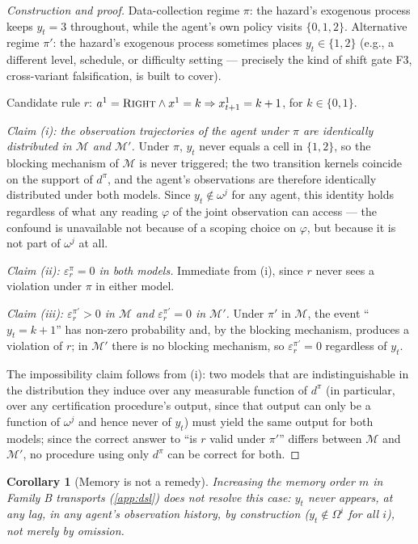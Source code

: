 \documentclass[11pt]{article}
\theoremstyle{plain}
\newtheorem{corollary}[theorem]{Corollary}
\theoremstyle{definition}
\theoremstyle{remark}
\begin{document}
\begin{proof}[Construction and proof]
Data-collection regime $\pi$: the hazard's exogenous process keeps $y_t=3$ throughout, while the agent's own policy visits $\{0,1,2\}$. Alternative regime $\pi'$: the hazard's exogenous process sometimes places $y_t\in\{1,2\}$ (e.g., a different level, schedule, or difficulty setting --- precisely the kind of shift gate F3, cross-variant falsification, is built to cover).

Candidate rule $r$: $a^1=\textsc{Right}\wedge x^1=k \Rightarrow x^1_{t+1}=k+1$, for $k\in\{0,1\}$.

\emph{Claim (i): the observation trajectories of the agent under $\pi$ are identically distributed in $\mathcal{M}$ and $\mathcal{M}'$.} Under $\pi$, $y_t$ never equals a cell in $\{1,2\}$, so the blocking mechanism of $\mathcal{M}$ is never triggered; the two transition kernels coincide on the support of $d^\pi$, and the agent's observations are therefore identically distributed under both models. Since $y_t\notin\omega^j$ for any agent, this identity holds regardless of what any reading $\varphi$ of the joint observation can access --- the confound is unavailable not because of a scoping choice on $\varphi$, but because it is not part of $\omega^j$ at all.

\emph{Claim (ii): $\varepsilon^\pi_r=0$ in both models.} Immediate from (i), since $r$ never sees a violation under $\pi$ in either model.

\emph{Claim (iii): $\varepsilon^{\pi'}_r>0$ in $\mathcal{M}$ and $\varepsilon^{\pi'}_r=0$ in $\mathcal{M}'$.} Under $\pi'$ in $\mathcal{M}$, the event ``$y_t=k+1$'' has non-zero probability and, by the blocking mechanism, produces a violation of $r$; in $\mathcal{M}'$ there is no blocking mechanism, so $\varepsilon^{\pi'}_r=0$ regardless of $y_t$.

The impossibility claim follows from (i): two models that are indistinguishable in the distribution they induce over any measurable function of $d^\pi$ (in particular, over any certification procedure's output, since that output can only be a function of $\omega^j$ and hence never of $y_t$) must yield the same output for both models; since the correct answer to ``is $r$ valid under $\pi'$'' differs between $\mathcal{M}$ and $\mathcal{M}'$, no procedure using only $d^\pi$ can be correct for both.
\end{proof}

\begin{corollary}[Memory is not a remedy]
Increasing the memory order $m$ in Family B transports (\autoref{app:dsl}) does not resolve this case: $y_t$ never appears, at any lag, in any agent's observation history, by construction ($y_t\notin\Omega^i$ for all $i$), not merely by omission.
\end{corollary}
\end{document}
